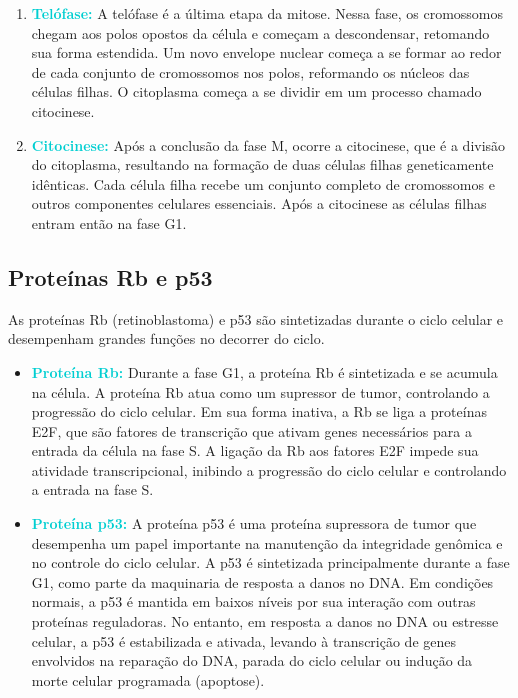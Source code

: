 \documentclass[11pt,a4paper]{article}
\begin{document}
\begin{enumerate}
		\item \textcolor{DarkTurquoise}{\textbf{Telófase:}}  A telófase é a última etapa da mitose. Nessa fase, os cromossomos chegam aos polos opostos da célula e começam a descondensar, retomando sua forma estendida. Um novo envelope nuclear começa a se formar ao redor de cada conjunto de cromossomos nos polos, reformando os núcleos das células filhas. O citoplasma começa a se dividir em um processo chamado citocinese.
		\item \textcolor{DarkTurquoise}{\textbf{Citocinese:}} Após a conclusão da fase M, ocorre a citocinese, que é a divisão do citoplasma, resultando na formação de duas células filhas geneticamente idênticas. Cada célula filha recebe um conjunto completo de cromossomos e outros componentes celulares essenciais. Após a citocinese as células filhas entram então na fase G1.
	\end{enumerate}

	\subsection{Proteínas Rb e p53}

	As proteínas Rb (retinoblastoma) e p53 são sintetizadas durante o ciclo celular e desempenham grandes funções no decorrer do ciclo.

	\begin{itemize}[label=\textcolor{CarnationPink}{$\blacktriangleright$}]
		\item \textcolor{DarkTurquoise}{\textbf{Proteína Rb:}} Durante a fase G1, a proteína Rb é sintetizada e se acumula na célula. A proteína Rb atua como um supressor de tumor, controlando a progressão do ciclo celular. Em sua forma inativa, a Rb se liga a proteínas E2F, que são fatores de transcrição que ativam genes necessários para a entrada da célula na fase S. A ligação da Rb aos fatores E2F impede sua atividade transcripcional, inibindo a progressão do ciclo celular e controlando a entrada na fase S.
		\item \textcolor{DarkTurquoise}{\textbf{Proteína p53:}} A proteína p53 é uma proteína supressora de tumor que desempenha um papel importante na manutenção da integridade genômica e no controle do ciclo celular. A p53 é sintetizada principalmente durante a fase G1, como parte da maquinaria de resposta a danos no DNA. Em condições normais, a p53 é mantida em baixos níveis por sua interação com outras proteínas reguladoras. No entanto, em resposta a danos no DNA ou estresse celular, a p53 é estabilizada e ativada, levando à transcrição de genes envolvidos na reparação do DNA, parada do ciclo celular ou indução da morte celular programada (apoptose).
	\end{itemize}
	
\end{document}
